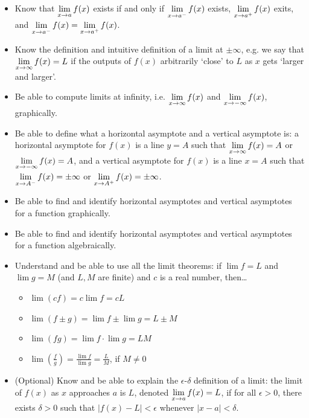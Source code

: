 \documentclass[11pt,letterpaper]{article}
\begin{document}
\begin{itemize}
\item Know that $\displaystyle\lim_{x \to a} f(x)$ exists if and only if $\displaystyle\lim_{x \to a^-} f(x)$ exists, $\displaystyle\lim_{x \to a^+} f(x)$ exits, and $\displaystyle\lim_{x \to a^-} f(x)= \lim_{x \to a^+} f(x)$. 

\item Know the definition and intuitive definition of a limit at $\pm \infty$, e.g. we say that $\displaystyle\lim_{x \to \infty} f(x)= L$ if the outputs of $f(x)$ arbitrarily `close' to $L$ as $x$ gets `larger and larger'.

\item Be able to compute limits at infinity, i.e. $\displaystyle\lim_{x \to \infty} f(x)$ and $\displaystyle\lim_{x \to -\infty} f(x)$, graphically. 

\item Be able to define what a horizontal asymptote and a vertical asymptote is: a horizontal asymptote for $f(x)$ is a line $y= A$ such that $\displaystyle\lim_{x \to \infty} f(x)= A$ or $\displaystyle\lim_{x \to -\infty} f(x)= A$, and a vertical asymptote for $f(x)$ is a line $x= A$ such that $\displaystyle\lim_{x \to A^-} f(x)= \pm \infty$ or $\displaystyle\lim_{x \to A^+} f(x)= \pm\infty$. 

\item Be able to find and identify horizontal asymptotes and vertical asymptotes for a function graphically. 

\item Be able to find and identify horizontal asymptotes and vertical asymptotes for a function algebraically.

\item Understand and be able to use all the limit theorems: if $\lim f= L$ and $\lim g= M$ (and $L, M$ are finite) and $c$ is a real number, then\dots
	\begin{itemize}
	\item $\lim (cf)= c \lim f= cL$
	\item $\lim (f \pm g)= \lim f \pm \lim g= L \pm M$
	\item $\lim (fg)= \lim f \cdot \lim g= LM$
	\item $\lim \left( \tfrac{f}{g} \right)= \tfrac{\lim f}{\lim g}= \tfrac{L}{M}$, if $M \neq 0$
	\end{itemize}

\item (Optional) Know and be able to explain the $\epsilon$-$\delta$ definition of a limit: the limit of $f(x)$ as $x$ approaches $a$ is $L$, denoted $\displaystyle\lim_{x \to a} f(x)= L$, if for all $\epsilon > 0$, there exists $\delta > 0$ such that $|f(x) - L| < \epsilon$ whenever $|x - a| < \delta$. 
\end{itemize}
\end{document}
